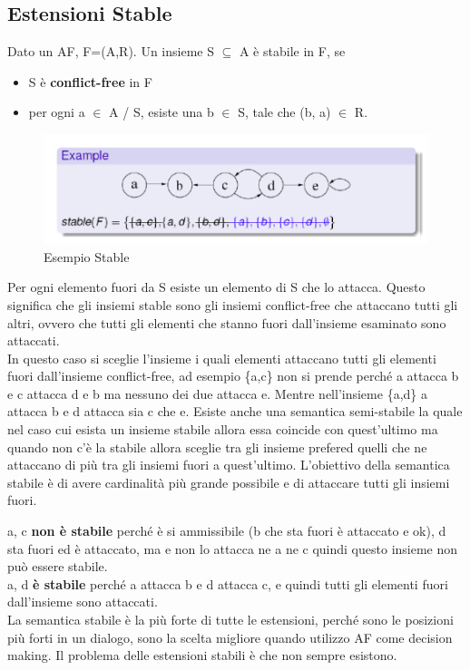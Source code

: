 \subsection{Estensioni Stable}
Dato un AF, F=(A,R). Un insieme S $\subseteq$ A è stabile in F, se
\begin{itemize}
    \item S è \textbf{conflict-free} in F
    \item per ogni a $\in$ A / S, esiste una b $\in$ S, tale che (b, a) $\in$ R.
\end{itemize}
\begin{figure}[H]
    \centering
    \includegraphics[width=12cm, keepaspectratio]{img/Cap6/stable.png}
    \caption{Esempio Stable}
\end{figure}
Per ogni elemento fuori da S esiste un elemento di S che lo attacca. Questo significa che gli insiemi stable sono gli insiemi conflict-free che attaccano tutti gli altri, ovvero che tutti gli elementi che stanno fuori dall'insieme esaminato sono attaccati.\\
In questo caso si sceglie l'insieme i quali elementi attaccano tutti gli elementi fuori dall'insieme conflict-free, ad esempio \{a,c\} non si prende perché a attacca b e c attacca d e b ma nessuno dei due attacca e. Mentre nell'insieme \{a,d\} a attacca b e d attacca sia c che e. Esiste anche una semantica semi-stabile la quale nel caso cui esista un insieme stabile allora essa coincide con quest'ultimo ma quando non c'è la stabile allora sceglie tra gli insieme prefered quelli che ne attaccano di più tra gli insiemi fuori a quest'ultimo. L'obiettivo della semantica stabile è di avere cardinalità più grande possibile e di attaccare tutti gli insiemi fuori.

\vspace{0.5cm}

\noindent a, c \textbf{non è stabile} perché è si ammissibile (b che sta fuori è attaccato e ok), d sta fuori ed è attaccato, ma e non lo attacca ne a ne c quindi questo insieme non può essere stabile.
\\a, d \textbf{è stabile} perché a attacca b e d attacca c, e quindi tutti gli elementi fuori dall'insieme sono attaccati.
\\La semantica stabile è la più forte di tutte le estensioni, perché sono le posizioni più forti in un dialogo, sono la scelta migliore quando utilizzo AF come decision making. Il problema delle estensioni stabili è che non sempre esistono.

